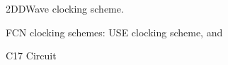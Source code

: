 \documentclass{article}
\begin{document}
\lipsum[1]

\begin{figure}[!htbp]
\centering
    \begin{subfigure}[t]{5cm}
        \centering
         
        \caption{}
        \label{fig:use-cs}
    \end{subfigure}
    \begin{subfigure}[t]{5cm}
        \centering
        
        \caption{}
        \label{fig:2dd-cs}
    \end{subfigure}
\captionsetup{subrefformat=parens}
\caption{FCN clocking schemes:  USE clocking scheme, and } 2DDWave clocking scheme.
\end{figure}

\lipsum[2]

\begin{figure}[!htbp]
    \centering
    
    \caption{C17 Circuit}
    \label{fig:c17_circuit}
\end{figure}
\end{document}

